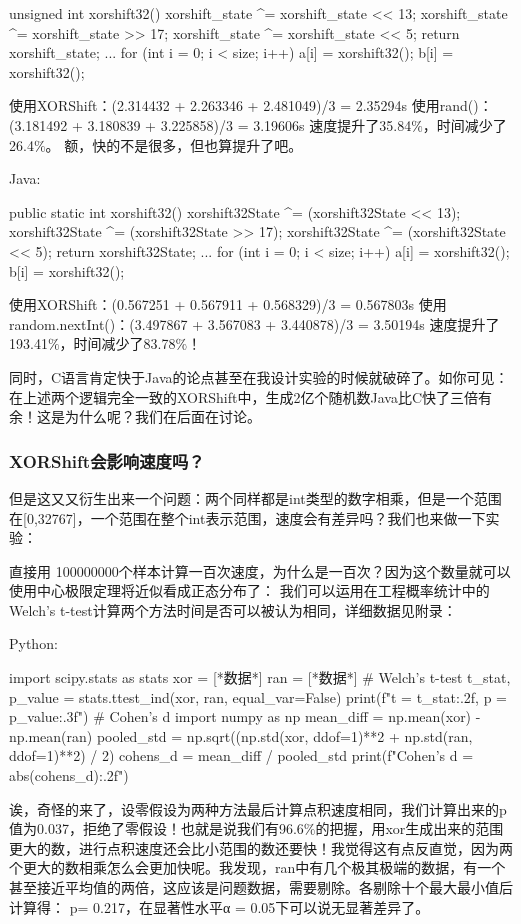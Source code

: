 \documentclass[11pt]{article}
\begin{document}
\begin{codeline}
    unsigned int xorshift32() {
    xorshift_state ^= xorshift_state << 13;
    xorshift_state ^= xorshift_state >> 17;
    xorshift_state ^= xorshift_state << 5;
    return xorshift_state;
}
...
for (int i = 0; i < size; i++) {
        a[i] = xorshift32();
        b[i] = xorshift32();
}
\end{codeline}
使用XORShift：(2.314432 + 2.263346 + 2.481049)/3 = 2.35294s
使用rand()：(3.181492 + 3.180839 + 3.225858)/3 = 3.19606s
速度提升了35.84$\%$，时间减少了26.4$\%$。
额，快的不是很多，但也算提升了吧。


Java:
\begin{codeline}
    public static int xorshift32(){
        xorshift32State ^= (xorshift32State << 13);
        xorshift32State ^= (xorshift32State >> 17);
        xorshift32State ^= (xorshift32State << 5);
        return xorshift32State;
}
...
for (int i = 0; i < size; i++) {
            a[i] =  xorshift32();
            b[i] =  xorshift32();
}
\end{codeline}
使用XORShift：(0.567251 + 0.567911 + 0.568329)/3 =  0.567803s
使用random.nextInt()：(3.497867 + 3.567083 + 3.440878)/3 = 3.50194s
速度提升了193.41$\%$，时间减少了83.78$\%$！


同时，C语言肯定快于Java的论点甚至在我设计实验的时候就破碎了。如你可见：在上述两个逻辑完全一致的XORShift中，生成2亿个随机数Java比C快了三倍有余！这是为什么呢？我们在后面在讨论。

\subsubsection{XORShift会影响速度吗？}
但是这又又衍生出来一个问题：两个同样都是int类型的数字相乘，但是一个范围在[0,32767]，一个范围在整个int表示范围，速度会有差异吗？我们也来做一下实验：


直接用 100000000个样本计算一百次速度，为什么是一百次？因为这个数量就可以使用中心极限定理将近似看成正态分布了：
我们可以运用在工程概率统计中的Welch's t-test计算两个方法时间是否可以被认为相同，详细数据见附录：


Python:
\begin{commandline}
import scipy.stats as stats
xor = [*数据*]
ran = [*数据*]
# Welch's t-test
t_stat, p_value = stats.ttest_ind(xor, ran, equal_var=False)
print(f"t = {t_stat:.2f}, p = {p_value:.3f}")
# Cohen's d
import numpy as np
mean_diff = np.mean(xor) - np.mean(ran)
pooled_std = np.sqrt((np.std(xor, ddof=1)**2 + np.std(ran, ddof=1)**2) / 2)
cohens_d = mean_diff / pooled_std
print(f"Cohen's d = {abs(cohens_d):.2f}")    
\end{commandline}
诶，奇怪的来了，设零假设为两种方法最后计算点积速度相同，我们计算出来的p值为0.037，拒绝了零假设！也就是说我们有96.6$\%$的把握，用xor生成出来的范围更大的数，进行点积速度还会比小范围的数还要快！我觉得这有点反直觉，因为两个更大的数相乘怎么会更加快呢。我发现，ran中有几个极其极端的数据，有一个甚至接近平均值的两倍，这应该是问题数据，需要剔除。各剔除十个最大最小值后计算得： p= 0.217，在显著性水平α = 0.05下可以说无显著差异了。
\end{document}
